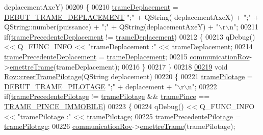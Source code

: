 \begin{DoxyCode}
      deplacementAxeY)
00209 \{
00210     \hyperlink{class_rov_ad30a06154c31cdb02eb28a0c7197731f}{trameDeplacement} = \hyperlink{rov_8h_a5bebf7c0b48103d44a372f28cf7f8981}{DEBUT\_TRAME\_DEPLACEMENT} \textcolor{stringliteral}{";"} + QString(
      deplacementAxeX) + \textcolor{stringliteral}{";"} + QString::number(puissance) + \textcolor{stringliteral}{";"} + QString(deplacementAxeY) + \textcolor{stringliteral}{"\(\backslash\)r\(\backslash\)n"};
00211     \textcolor{keywordflow}{if}(\hyperlink{class_rov_a6e42b166c837f5103b53bb9eae35f087}{tramePrecedenteDeplacement} != \hyperlink{class_rov_ad30a06154c31cdb02eb28a0c7197731f}{trameDeplacement})
00212     \{
00213         qDebug() << Q\_FUNC\_INFO << \textcolor{stringliteral}{"trameDeplacement :"} << \hyperlink{class_rov_ad30a06154c31cdb02eb28a0c7197731f}{trameDeplacement};
00214         \hyperlink{class_rov_a6e42b166c837f5103b53bb9eae35f087}{tramePrecedenteDeplacement} = \hyperlink{class_rov_ad30a06154c31cdb02eb28a0c7197731f}{trameDeplacement};
00215         \hyperlink{class_rov_a8e7aaa17ee2134f26d57241d11ab2a99}{communicationRov}->\hyperlink{class_communication_rov_a4f52076db8d6e78abe1745fa1e235272}{emettreTrame}(trameDeplacement);
00216     \}
00217 \}
00218 
\hyperlink{class_rov_a97be62676ab0d57d5a8ac498147905ec}{00219} \textcolor{keywordtype}{void} \hyperlink{class_rov_a97be62676ab0d57d5a8ac498147905ec}{Rov::creerTramePilotage}(QString deplacement)
00220 \{
00221     \hyperlink{class_rov_a379b288ce69a0bb9eaac8f673db8ae07}{tramePilotage} = \hyperlink{rov_8h_a023822fa9447e76b37e5d5c78f5c64f9}{DEBUT\_TRAME\_PILOTAGE} \textcolor{stringliteral}{";"} + deplacement + \textcolor{stringliteral}{"\(\backslash\)r\(\backslash\)n"};
00222     \textcolor{keywordflow}{if}(\hyperlink{class_rov_a12b08128a49ca43fc1198fdeb6a6f0cd}{tramePrecedentePilotage} != \hyperlink{class_rov_a379b288ce69a0bb9eaac8f673db8ae07}{tramePilotage} && 
      \hyperlink{class_rov_a2c24d7c884d8fae07e452105037f8e2c}{tramePince} == \hyperlink{rov_8h_ab46e52d96e193353eadd9cd7f598f670}{TRAME\_PINCE\_IMMOBILE})
00223     \{
00224         qDebug() << Q\_FUNC\_INFO << \textcolor{stringliteral}{"tramePilotage :"} << \hyperlink{class_rov_a379b288ce69a0bb9eaac8f673db8ae07}{tramePilotage};
00225         \hyperlink{class_rov_a12b08128a49ca43fc1198fdeb6a6f0cd}{tramePrecedentePilotage} = \hyperlink{class_rov_a379b288ce69a0bb9eaac8f673db8ae07}{tramePilotage};
00226         \hyperlink{class_rov_a8e7aaa17ee2134f26d57241d11ab2a99}{communicationRov}->\hyperlink{class_communication_rov_a4f52076db8d6e78abe1745fa1e235272}{emettreTrame}(tramePilotage);

\end{DoxyCode}

